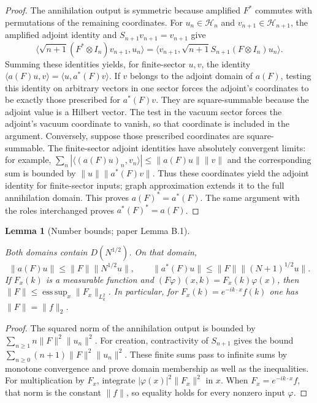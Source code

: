 \documentclass[11pt,a4paper]{article}
\newtheorem{lemma}[theorem]{Lemma}
\theoremstyle{definition}
\theoremstyle{remark}
\newcommand{\proofid}[1]{\par\smallskip{\normalfont\scriptsize\color{inkblue}Stable ID: \nolinkurl{#1}}\par\smallskip}
\begin{document}
\begin{proof}
The annihilation output is symmetric because amplified $F^*$
commutes with permutations of the remaining coordinates. For
$u_n\in\mathcal H_n$ and $v_{n+1}\in\mathcal H_{n+1}$, the
amplified adjoint identity and $S_{n+1}v_{n+1}=v_{n+1}$ give
\[
 \langle\sqrt{n+1}(F^*\otimes I_n)v_{n+1},u_n\rangle
 =\langle v_{n+1},\sqrt{n+1}S_{n+1}(F\otimes I_n)u_n\rangle.
\]
Summing these identities yields, for finite-sector $u,v$, the identity
$\langle a(F)u,v\rangle=\langle u,a^*(F)v\rangle$. If $v$ belongs to the
adjoint domain of $a(F)$, testing this identity on arbitrary vectors in
one sector forces the adjoint's coordinates to be exactly those prescribed
for $a^*(F)v$. They are square-summable because the adjoint value is a
Hilbert vector. The test in the vacuum sector forces the adjoint's
vacuum coordinate to vanish, so that coordinate is included in the
argument. Conversely, suppose those prescribed coordinates
are square-summable. The finite-sector adjoint identities have
absolutely convergent limits: for example,
$\sum_n|\langle (a(F)u)_n,v_n\rangle|
\leq\|a(F)u\|\|v\|$ and the corresponding sum is bounded by
$\|u\|\|a^*(F)v\|$. Thus these coordinates yield the adjoint identity
for finite-sector inputs; graph approximation extends it to the full
annihilation domain. This proves $a(F)^*=a^*(F)$. The same argument with
the roles interchanged proves $a^*(F)^*=a(F)$.
\end{proof}

\begin{lemma}[Number bounds; paper Lemma B.1]
\label{fock:generalized-bounds}
\proofid{fock:generalized-bounds}
\par{}\par\smallskip

Both domains contain $D(N^{1/2})$. On that domain,
\[
 \|a(F)u\|\leq\|F\|\|N^{1/2}u\|,
 \qquad
 \|a^*(F)u\|\leq\|F\|\|(N+1)^{1/2}u\|.
\]
If $F_x(k)$ is a measurable function and
$(F\varphi)(x,k)=F_x(k)\varphi(x)$, then
$\|F\|\leq\operatorname*{ess\,sup}_x\|F_x\|_{L^2_k}$.
In particular, for $F_x(k)=e^{-ik\cdot x}f(k)$ one has
$\|F\|=\|f\|_2$.
\end{lemma}
\begin{proof}
The squared norm of the annihilation output is bounded by
$\sum_{n\geq1}n\|F\|^2\|u_n\|^2$.
For creation, contractivity of $S_{n+1}$ gives the bound
$\sum_{n\geq0}(n+1)\|F\|^2\|u_n\|^2$.
These finite sums pass to infinite sums by monotone convergence and
prove domain membership as well as the inequalities. For multiplication
by $F_x$, integrate
$|\varphi(x)|^2\|F_x\|^2$ in $x$.
When $F_x=e^{-ik\cdot x}f$, that norm is the constant $\|f\|$, so equality
holds for every nonzero input $\varphi$.
\end{proof}
\end{document}
